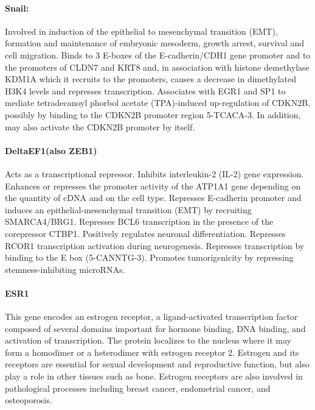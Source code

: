 \documentclass[12pt]{article}
\begin{document}
\paragraph{Snail:}
Involved in induction of the epithelial to mesenchymal transition (EMT), formation and maintenance of embryonic mesoderm, growth arrest, survival and cell migration. Binds to 3 E-boxes of the E-cadherin/CDH1 gene promoter and to the promoters of CLDN7 and KRT8 and, in association with histone demethylase KDM1A which it recruits to the promoters, causes a decrease in dimethylated H3K4 levels and represses transcription. Associates with EGR1 and SP1 to mediate tetradecanoyl phorbol acetate (TPA)-induced up-regulation of CDKN2B, possibly by binding to the CDKN2B promoter region 5-TCACA-3. In addition, may also activate the CDKN2B promoter by itself.


\paragraph{DeltaEF1(also ZEB1)}

Acts as a transcriptional repressor. Inhibits interleukin-2 (IL-2) gene expression. Enhances or represses the promoter activity of the ATP1A1 gene depending on the quantity of cDNA and on the cell type. Represses E-cadherin promoter and induces an epithelial-mesenchymal transition (EMT) by recruiting SMARCA4/BRG1. Represses BCL6 transcription in the presence of the corepressor CTBP1. Positively regulates neuronal differentiation. Represses RCOR1 transcription activation during neurogenesis. Represses transcription by binding to the E box (5-CANNTG-3). Promotes tumorigenicity by repressing stemness-inhibiting microRNAs.


\paragraph{ESR1}

This gene encodes an estrogen receptor, a ligand-activated transcription factor composed of several domains important for hormone binding, DNA binding, and activation of transcription. The protein localizes to the nucleus where it may form a homodimer or a heterodimer with estrogen receptor 2. Estrogen and its receptors are essential for sexual development and reproductive function, but also play a role in other tissues such as bone. Estrogen receptors are also involved in pathological processes including breast cancer, endometrial cancer, and osteoporosis.
\end{document}
